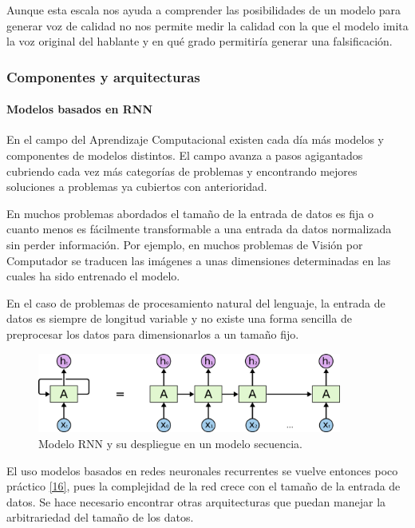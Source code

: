 Aunque esta escala nos ayuda a comprender las posibilidades de un modelo para generar voz de calidad no nos permite medir la calidad con la que el modelo imita la voz original del hablante y en qué grado permitiría generar una falsificación.

\subsubsection{Componentes y arquitecturas}

\paragraph{Modelos basados en RNN}

En el campo del Aprendizaje Computacional existen cada día más modelos y componentes de modelos distintos. El campo avanza a pasos agigantados cubriendo cada vez más categorías de problemas y encontrando mejores soluciones a problemas ya cubiertos con anterioridad.

En muchos problemas abordados el tamaño de la entrada de datos es fija o cuanto menos es fácilmente transformable a una entrada da datos normalizada sin perder información. Por ejemplo, en muchos problemas de Visión por Computador se traducen las imágenes a unas dimensiones determinadas en las cuales ha sido entrenado el modelo. 

En el caso de problemas de procesamiento natural del lenguaje, la entrada de datos es siempre de longitud variable y no existe una forma sencilla de preprocesar los datos para dimensionarlos a un tamaño fijo.


\begin{figure}[H]
\centering
\includegraphics[width=10cm]{5_resultados_img/rnn-1.png}
\caption{Modelo RNN y su despliegue en un modelo secuencia.}
\label{fig:figure1}
\end{figure}

El uso modelos basados en redes neuronales recurrentes se vuelve entonces poco práctico \hyperref[RES_2]{[16]}, pues la complejidad de la red crece con el tamaño de la entrada de datos. Se hace necesario encontrar otras arquitecturas que puedan manejar la arbitrariedad del tamaño de los datos.

